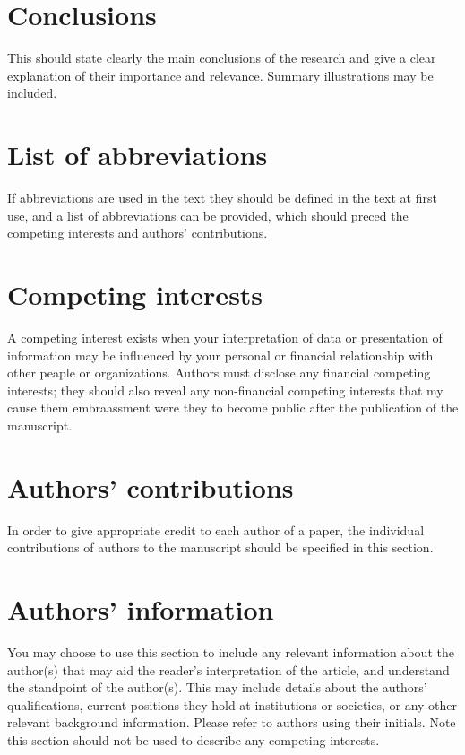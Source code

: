 \documentclass{EPS}
\begin{document}
\section{Conclusions}

This should state clearly the main conclusions of the research
and give a clear explanation of their importance and relevance.
Summary illustrations may be included.

\section{List of abbreviations}

If abbreviations are used in the text
they should be defined in the text at first use,
and a list of abbreviations can be provided,
which should preced the competing interests and authors' contributions.

\section{Competing interests}

A competing interest exists when your interpretation of data or
presentation of information may be influenced by your personal or
financial relationship with other peaple or organizations.
Authors must disclose any financial competing interests;
they should also reveal any non-financial competing interests
that my cause them embraassment were they to become public
after the publication of the manuscript.

\section{Authors' contributions}

In order to give appropriate credit to each author of a paper,
the individual contributions of authors to the manuscript
should be specified in this section.

\section{Authors' information}

You may choose to use this section to include any relevant
information about the author(s) that may aid the reader's interpretation
of the article, and understand the standpoint of the author(s).
This may include details about the authors' qualifications,
current positions they hold at institutions or societies,
or any other relevant background information.
Please refer to authors using their initials.
Note this section should not be used
to describe any competing interests.
\end{document}
